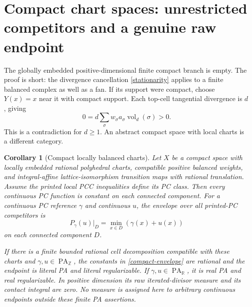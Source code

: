 \documentclass[11pt]{article}
\newtheorem{corollary}[theorem]{Corollary}
\newcommand{\R}{\mathbb R}
\newcommand{\Z}{\mathbb Z}
\newcommand{\PA}{\operatorname{PA}}
\begin{document}
\section{Compact chart spaces: unrestricted competitors and a genuine raw endpoint}
The globally embedded positive-dimensional finite compact branch is empty. The proof is short: the divergence cancellation \eqref{stationarity} applies to a finite balanced complex as well as a fan. If its support were compact, choose $Y(x)=x$ near it with compact support. Each top-cell tangential divergence is $d$, giving
\[0=d\sum_\sigma w_\sigma a_\sigma\operatorname{vol}_d(\sigma)>0.
\]
This is a contradiction for $d\geq1$. An abstract compact space with local charts is a different category.

\begin{corollary}[Compact locally balanced charts]\label{compact}
Let $X$ be a compact space with locally embedded rational polyhedral charts, compatible positive balanced weights, and integral-affine lattice-isomorphism transition maps with rational translation. Assume the printed local PCC inequalities define its PC class. Then every continuous PC function is constant on each connected component. For a continuous PC reference $\gamma$ and continuous $u$, the envelope over \emph{all} printed-PC competitors is
\begin{equation}\label{compact-envelope}
 P_\gamma(u)|_D=\min_{x\in D}(\gamma(x)+u(x))
\end{equation}
on each connected component $D$.

If there is a finite bounded rational cell decomposition compatible with these charts and $\gamma,u\in\PA_\Z$, the constants in \eqref{compact-envelope} are rational and the endpoint is literal PA and literal regularizable. If $\gamma,u\in\PA_\R$, it is real PA and real regularizable. In positive dimension its raw iterated-divisor measure and its contact integral are zero. No measure is assigned here to arbitrary continuous endpoints outside these finite PA assertions.
\end{corollary}
\end{document}
